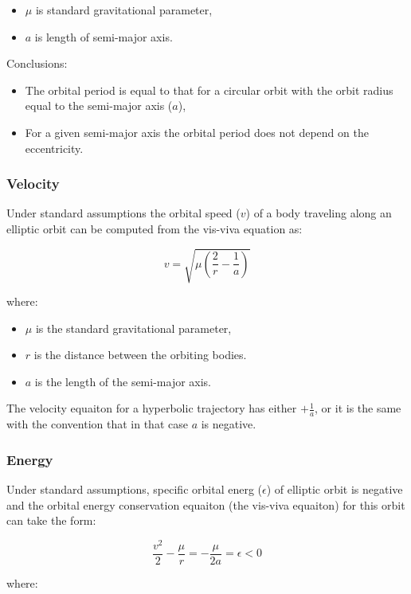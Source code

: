 \documentclass[12pt]{article}
\begin{document}
\begin{itemize}
  \item \(\mu\) is standard gravitational parameter,
  \item \(a\) is length of semi-major axis.
\end{itemize}

Conclusions:

\begin{itemize}
  \item The orbital period is equal to that for a circular orbit with the orbit radius equal to the semi-major axis (\(a\)),
  \item For a given semi-major axis the orbital period does not depend on the eccentricity.
\end{itemize}

\subsubsection{Velocity}

Under standard assumptions the orbital speed (\(v\)) of a body traveling along an elliptic orbit can be computed from the vis-viva equation as:

\[v=\sqrt{\mu\left({\frac{2}{r}-\frac{1}{a}}\right)}\]

where:

\begin{itemize}
  \item \(\mu\) is the standard gravitational parameter,
  \item \(r\) is the distance between the orbiting bodies.
  \item \(a\) is the length of the semi-major axis.
\end{itemize}

The velocity equaiton for a hyperbolic trajectory has either \(+\frac{1}{a}\), or it is the same with the convention that in that case \(a\) is negative.

\subsubsection{Energy}

Under standard assumptions, specific orbital energ (\(\epsilon\)) of elliptic orbit is negative and the orbital energy conservation equaiton (the vis-viva equaiton) for this orbit can take the form:

\[\frac{v^2}{2}-\frac{\mu}{r}=-\frac{\mu}{2a}=\epsilon<0\]

where:
\end{document}
